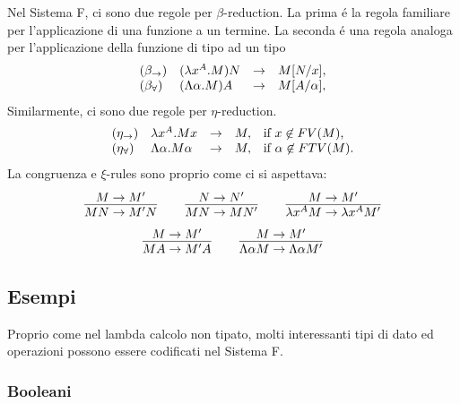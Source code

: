 \documentclass{article}
\begin{document}
Nel Sistema F, ci sono due regole per $\beta$-reduction.  La prima \'e la 
regola familiare per l'applicazione di una funzione a un termine. La seconda
 \'e una regola analoga per l'applicazione della funzione di tipo ad un tipo
\[ \begin{array}{lllll}
  (\beta_{\to}) & (\lambda x^{A}.M)N & \to & M[N/x], \\
  (\beta_{\forall}) & (\Lambda\alpha.M)A & \to & M[A/\alpha],
\end{array}
\]
Similarmente, ci sono due regole per $\eta$-reduction.
\[ \begin{array}{lllll}
  (\eta_{\to}) & \lambda x^{A}.Mx & \to & M, & \mbox{if $x\not\in FV(M)$,} \\
  (\eta_{\forall}) & \Lambda\alpha.M\alpha & \to & M, & \mbox{if $\alpha\not\in FTV(M)$.}
\end{array}
\]
La congruenza e $\xi$-rules sono proprio come ci si aspettava:
\[ \deriv{M\to M'}{MN\to M'N}
   \sep
   \deriv{N\to N'}{MN\to MN'}
   \sep
   \deriv{M\to M'}{\lamabs{x}{A}{M}\to\lamabs{x}{A}{M'}}
\]
\[ \deriv{M\to M'}{MA\to M'A}
   \sep
   \deriv{M\to M'}{\Lamabs{\alpha}{M}\to\Lamabs{\alpha}{M'}}
\]

\subsection{Esempi}

Proprio come nel lambda calcolo non tipato, molti interessanti tipi di dato
ed operazioni possono essere codificati nel Sistema F. 

\subsubsection{Booleani}
\end{document}
